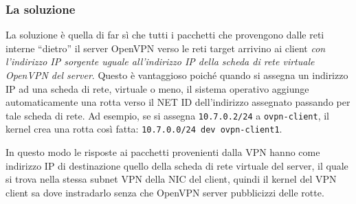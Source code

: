 \subsubsection{La soluzione}
La soluzione è quella di far sì che tutti i pacchetti che provengono dalle reti interne
``dietro'' il server OpenVPN
verso le reti target arrivino ai client \textit{con l'indirizzo IP sorgente uguale
all'indirizzo IP della scheda di rete virtuale OpenVPN del server}.
Questo è vantaggioso poiché quando si assegna un indirizzo IP ad una scheda di rete, virtuale
o meno, il sistema operativo aggiunge automaticamente una rotta verso il NET ID dell'indirizzo
assegnato passando per tale scheda di rete. Ad esempio, se si assegna \texttt{10.7.0.2/24}
a \texttt{ovpn-client}, il kernel crea una rotta così fatta: \texttt{10.7.0.0/24 dev ovpn-client1}.

In questo modo le risposte ai pacchetti provenienti dalla VPN hanno come indirizzo IP di destinazione
quello della scheda di rete virtuale del server, il quale si trova nella stessa subnet VPN
della NIC del client, quindi il kernel del VPN client sa dove instradarlo senza che OpenVPN server
pubblicizzi delle rotte.


